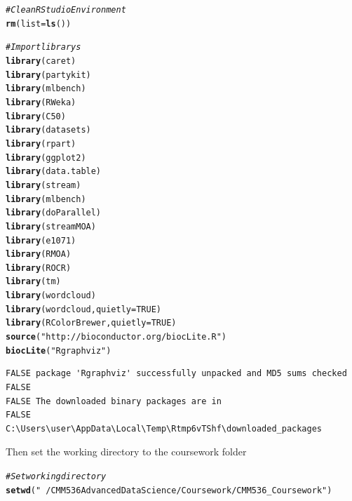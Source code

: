 \documentclass[10pt  ,usenames, dvipsnames]{article}\usepackage[]{graphicx}\usepackage[]{color}
\makeatletter
\newcommand{\hlnum}[1]{\textcolor[rgb]{0.686,0.059,0.569}{#1}}%
\newcommand{\hlstr}[1]{\textcolor[rgb]{0.192,0.494,0.8}{#1}}%
\newcommand{\hlcom}[1]{\textcolor[rgb]{0.678,0.584,0.686}{\textit{#1}}}%
\newcommand{\hlstd}[1]{\textcolor[rgb]{0.345,0.345,0.345}{#1}}%
\newcommand{\hlkwc}[1]{\textcolor[rgb]{0.333,0.667,0.333}{#1}}%
\newcommand{\hlkwd}[1]{\textcolor[rgb]{0.737,0.353,0.396}{\textbf{#1}}}%
\newenvironment{kframe}{%
 \def\at@end@of@kframe{}%
 \ifinner\ifhmode%
  \def\at@end@of@kframe{\end{minipage}}%
  \begin{minipage}{\columnwidth}%
 \fi\fi%
 \def\FrameCommand##1{\hskip\@totalleftmargin \hskip-\fboxsep
 \colorbox{shadecolor}{##1}\hskip-\fboxsep
     \hskip-\linewidth \hskip-\@totalleftmargin \hskip\columnwidth}%
 \MakeFramed {\advance\hsize-\width
   \@totalleftmargin\z@ \linewidth\hsize
   \@setminipage}}%
 {\par\unskip\endMakeFramed%
 \at@end@of@kframe}
\newenvironment{knitrout}{}{} %
\makeatother
\begin{document}
\begin{knitrout}
\color{fgcolor}\begin{kframe}
\begin{alltt}
\hlcom{#Clean RStudio Environment}
\hlkwd{rm}\hlstd{(}\hlkwc{list} \hlstd{=} \hlkwd{ls}\hlstd{())}

\hlcom{#Import librarys}
\hlkwd{library}\hlstd{(caret)}
\hlkwd{library}\hlstd{(partykit)}
\hlkwd{library}\hlstd{(mlbench)}
\hlkwd{library}\hlstd{(RWeka)}
\hlkwd{library}\hlstd{(C50)}
\hlkwd{library}\hlstd{(datasets)}
\hlkwd{library}\hlstd{(rpart)}
\hlkwd{library}\hlstd{(ggplot2)}
\hlkwd{library}\hlstd{(data.table)}
\hlkwd{library}\hlstd{(stream)}
\hlkwd{library}\hlstd{(mlbench)}
\hlkwd{library}\hlstd{(doParallel)}
\hlkwd{library}\hlstd{(streamMOA)}
\hlkwd{library}\hlstd{(e1071)}
\hlkwd{library}\hlstd{(RMOA)}
\hlkwd{library}\hlstd{(ROCR)}
\hlkwd{library}\hlstd{(tm)}
\hlkwd{library}\hlstd{(wordcloud)}
\hlkwd{library}\hlstd{(wordcloud,}\hlkwc{quietly}\hlstd{=}\hlnum{TRUE}\hlstd{)}
\hlkwd{library}\hlstd{(RColorBrewer,}\hlkwc{quietly}\hlstd{=}\hlnum{TRUE}\hlstd{)}
\hlkwd{source}\hlstd{(}\hlstr{"http://bioconductor.org/biocLite.R"}\hlstd{)}
\hlkwd{biocLite}\hlstd{(}\hlstr{"Rgraphviz"}\hlstd{)}
\end{alltt}
\end{kframe}
\end{knitrout}

\begin{knitrout}
\color{fgcolor}\begin{kframe}
\begin{verbatim}
FALSE package 'Rgraphviz' successfully unpacked and MD5 sums checked
FALSE 
FALSE The downloaded binary packages are in
FALSE 	C:\Users\user\AppData\Local\Temp\Rtmp6vTShf\downloaded_packages
\end{verbatim}
\end{kframe}
\end{knitrout}

Then set the working directory to the coursework folder

\begin{knitrout}
\color{fgcolor}\begin{kframe}
\begin{alltt}
\hlcom{#Set working directory}
\hlkwd{setwd}\hlstd{(}\hlstr{"~/CMM536 Advanced Data Science/Coursework/CMM536_Coursework"}\hlstd{)}
\end{alltt}
\end{kframe}
\end{knitrout}
\end{document}
